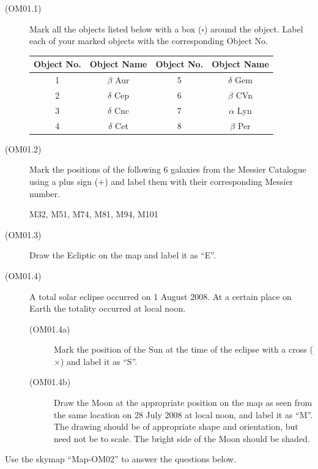 \begin{description}
\item[(OM01.1)] Mark all the objects listed below with a box ($\square$)
  around the object. Label each of your marked objects with the corresponding
  Object No.

  \begin{center}
  \begin{tabular}{cccc}
  Object No. & Object Name & Object No. & Object Name \\
  \hline
  1 & $\beta$ Aur & 5 & $\delta$ Gem \\
  2 & $\delta$ Cep & 6 & $\beta$ CVn \\
  3 & $\delta$ Cnc & 7 & $\alpha$ Lyn \\
  4 & $\delta$ Cet & 8 & $\beta$ Per \\
  \end{tabular}
  \end{center}

\item[(OM01.2)] Mark the positions of the following 6 galaxies from the
  Messier Catalogue using a plus sign ($+$) and label them with their
  corresponding Messier number.

  M32, M51, M74, M81, M94, M101

\item[(OM01.3)] Draw the Ecliptic on the map and label it as ``E''.

\item[(OM01.4)] A total solar eclipse occurred on 1 August 2008. At a certain
  place on Earth the totality occurred at local noon.
  \begin{description}
  \item[(OM01.4a)] Mark the position of the Sun at the time of the eclipse
    with a cross ($\times$) and label it as ``S''.
  \item[(OM01.4b)] Draw the Moon at the appropriate position on the map as
    seen from the same location on 28 July 2008 at local noon, and label it as
    ``M''. The drawing should be of appropriate shape and orientation, but
    need not be to scale. The bright side of the Moon should be shaded.
  \end{description}
\end{description}

Use the skymap ``Map-OM02'' to answer the questions below.


